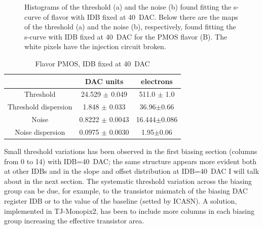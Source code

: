 \begin{figure}[h!]
            \label{fig:threshold_noise_hist}
            \caption{Histograms of the threshold (a) and the noise (b) found fitting the s-curve of  flavor with IDB fixed at \SI{40}{DAC}. Below there are the maps of the threshold (a) and the noise (b), respectively, found fitting the s-curve with IDB fixed at \SI{40}{DAC} for the PMOS flavor (B). The white pixels have the injection circuit broken.}
        \end{figure}      
        \begin{table}
                \begin{center}
                \begin{tabular}{| c | c | c |}
                \hline
                 & DAC units & electrons \\
                \hline
                \hline
                Threshold        & 24.529 $\pm$ 0.049 & 511.0 $\pm$ 1.0 \\
                Threshold dispersion & 1.848 $\pm$ 0.033 & 36.96$\pm$0.66\\
                Noise            & 0.8222 $\pm$ 0.0043 & 16.444$\pm$0.086 \\
                Noise dispersion & 0.0975 $\pm$ 0.0030 & 1.95$\pm$0.06\\
                \hline
                \end{tabular}
                \caption{Flavor PMOS, IDB fixed at \SI{40}{DAC}}
                \label{tab:Flavor_PMOS_reser}
                \end{center}
        \end{table}        
    
    
    
        Small threshold variations has been observed in the first biasing section (columns from 0 to 14) with IDB=\SI{40}{DAC}; the same structure appears more evident both at other IDBs and in the slope and offset distribution at IDB=\SI{40}{DAC} I will talk about in the next section.  
        The systematic threshold variation across the biasing group can be due, for example, to the transistor mismatch of the biasing DAC register IDB or to the value of the baseline (setted by ICASN).
        A solution, implemented in TJ-Monopix2, has been to include more columns in each biasing group increasing the effective transistor area.\\

